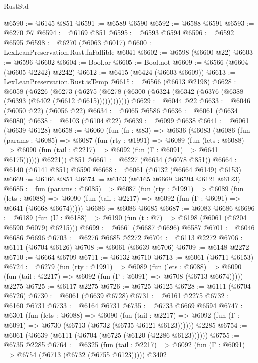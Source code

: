 \begin{lexlean}{RustStd}
\begin{coremodule}
{\begin{coremodule}
{{{{{{{{{{{{{{{{{{{{{{{{{{@6590 := @6145 @851
@6591 := @6589 @6590
@6592 := @6588 @6591
@6593 := @6270 @7
@6594 := @6169 @851
@6595 := @6593 @6594
@6596 := @6592 @6595
@6598 := @6270 (@6063 @6017)
@6600 := LexLeanPreservation.Rust.fnFallible @6041
@6602 := @6598 (@6600 @22)
@6603 := @6596 @6602
@6604 := Bool.or
@6605 := Bool.not
@6609 := @6566 (@6604 (@6605 @2242) @2242)
@6612 := @6415 (@6424 (@6603 @6609))
@6613 := LexLeanPreservation.Rust.isTemp
@6615 := @6566 (@6613 @2198)
@6628 := @6058
    (@6226
      (@6273 (@6275 (@6278 (@6300 (@6324 (@6342 (@6376 (@6388 (@6393 (@6402 (@6612 @6615))))))))))))
@6629 := @6044 @22
@6633 := @6046 (@6050 @22) (@6056 @22)
@6634 := @6065 @6586
@6636 := @6061 (@6634 @6080)
@6638 := @6103 (@6104 @22)
@6639 := @6099 @6638
@6641 := @6061 (@6639 @6128)
@6658 := @6060
    (fun (fn : @83) =>
    @6636
      (@6083
        (@6086
          (fun (params : @6085) =>
          @6087
            (fun (rty : @1991) =>
            @6089
              (fun (lets : @6088) =>
              @6090 (fun (tail : @2217) => @6092 (fun (Γ : @6091) => @6641 @6175))))))
        @6221))
    @851
@6661 := @6227 (@6634 (@6078 @851))
@6664 := @6140 (@6141 @851) @6590
@6668 := @6061 (@6132 (@6664 @6149) @6153)
@6669 := @6166 @851
@6674 := @6163 (@6165 @6669 @6594 @6121 @6123)
@6685 := fun (params : @6085) =>
  @6087
    (fun (rty : @1991) =>
    @6089
      (fun (lets : @6088) =>
      @6090 (fun (tail : @2217) => @6092 (fun (Γ : @6091) => @6641 (@6668 @6674)))))
@6686 := @6086 @6685
@6687 := @6083 @6686
@6696 := @6189 (fun (U : @6188) => @6190 (fun (t : @7) => @6198 (@6061 (@6204 @6590 @6079) @6215)))
@6699 := @6661 (@6687 @6696) @6587
@6701 := @6046 @6686 @6696
@6703 := @6276 @6685 @2272
@6704 := @6113 @2272
@6706 := @6111 (@6704 @6126)
@6708 := @6061 (@6639 @6706)
@6709 := @6148 @2272
@6710 := @6664 @6709
@6711 := @6132 @6710
@6713 := @6061 (@6711 @6153)
@6724 := @6279
    (fun (rty : @1991) =>
    @6089
      (fun (lets : @6088) =>
      @6090 (fun (tail : @2217) => @6092 (fun (Γ : @6091) => @6708 (@6713 @6674)))))
    @2275
@6725 := @6117 @2275
@6726 := @6725 @6125
@6728 := @6111 (@6704 @6726)
@6730 := @6061 (@6639 @6728)
@6731 := @6161 @2275
@6732 := @6160 @6731
@6733 := @6164 @6731
@6735 := @6733 @6669 @6594
@6747 := @6301
    (fun (lets : @6088) =>
    @6090
      (fun (tail : @2217) => @6092 (fun (Γ : @6091) => @6730 (@6713 (@6732 (@6735 @6121 @6123))))))
    @2285
@6754 := @6061 (@6639 (@6111 (@6704 (@6725 (@6120 (@2286 @6123))))))
@6755 := @6735 @2285
@6764 := @6325
    (fun (tail : @2217) => @6092 (fun (Γ : @6091) => @6754 (@6713 (@6732 (@6755 @6123)))))
    @3402
}}}}}}}}}}}}}}}}}}}}}}}}}}
\end{coremodule}}
\end{coremodule}
\end{lexlean}

